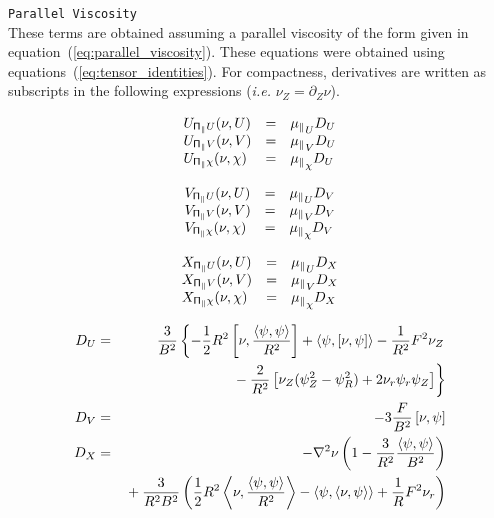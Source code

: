 \texttt{Parallel Viscosity}
\\
These terms are obtained assuming a parallel viscosity of the form
given in equation~(\ref{eq:parallel_viscosity}).  These equations were
obtained using equations~(\ref{eq:tensor_identities}).  For
compactness, derivatives are written as subscripts in the following
expressions (\textit{i.e.} $\nu_Z = \partial_Z \nu$).

\begin{equation}
  \begin{array}{lcl}
    U_{\P_\parallel U}(\nu, U) & = & {\mu_\parallel}_U D_U
    \\
    U_{\P_\parallel V}(\nu, V) & = & {\mu_\parallel}_V D_U
    \\
    U_{\P_\parallel \chi}(\nu, \chi) & = & {\mu_\parallel}_\chi D_U
  \end{array}
\end{equation}

\begin{equation}
  \begin{array}{lcl}
    V_{\P_\parallel U}(\nu, U) & = & {\mu_\parallel}_U D_V
    \\
    V_{\P_\parallel V}(\nu, V) & = & {\mu_\parallel}_V D_V
    \\
    V_{\P_\parallel \chi}(\nu, \chi) & = & {\mu_\parallel}_\chi D_V
  \end{array}
\end{equation}

\begin{equation}
  \begin{array}{lcl}
    X_{\P_\parallel U}(\nu, U) & = & {\mu_\parallel}_U D_X
    \\
    X_{\P_\parallel V}(\nu, V) & = & {\mu_\parallel}_V D_X
    \\
    X_{\P_\parallel \chi}(\nu, \chi) & = & {\mu_\parallel}_\chi D_X
  \end{array}
\end{equation}

\begin{eqnarray*}
  D_U & = & \frac{3}{B^2} \left\{ 
  - \frac{1}{2}R^2\pb{\nu}{\frac{\ip{\psi}{\psi}}{R^2}}
  + \ip{\psi}{\pb{\nu}{\psi}} 
  - \frac{1}{R^2} F^2 \nu_Z 
  \right.\\ && \left. \mbox{}
  - \frac{2}{R^2}\left[ \nu_Z (\psi_Z^2 - \psi_R^2) + 2\nu_r \psi_r \psi_Z
    \right]
  \right\}
  \\
  D_V & = & - 3 \frac{F}{B^2} \pb{\nu}{\psi}
  \\
  D_X & = & - \lp{\nu} 
  \left(1 - \frac{3}{R^2}\frac{\ip{\psi}{\psi}}{B^2} \right)
  \\ &&  \mbox{}
  + \frac{3}{R^2 B^2} \left(
    \frac{1}{2}R^2\ip{\nu}{\frac{\ip{\psi}{\psi}}{R^2}}
    - \ip{\psi}{\ip{\nu}{\psi}} 
    + \frac{1}{R} F^2 \nu_r \right)
\end{eqnarray*}

